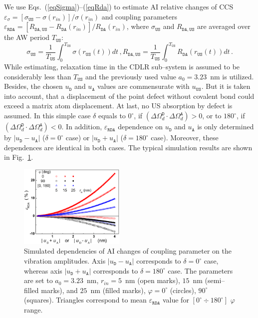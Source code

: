 \documentclass[aip,jap, amsmath,amssymb,reprint]{revtex4-1}
\begin{document}
We use Eqs.~(\ref{eqSigma})--(\ref{eqRda}) to estimate AI relative changes of CCS
$\varepsilon_\sigma=[\sigma_{\mathtt{US}}-\sigma(r_{in})]/\sigma(r_{in})$
and coupling parameters $\varepsilon_{\mathtt{RDA}}=[R_{\mathtt{DA,US}}-R_\mathtt{DA}(r_{in})]/R_\mathtt{DA}(r_{in})$,
where $\sigma_{\mathtt{US}}$ and $R_{\mathtt{DA,US}}$ are averaged over the AW period $T_\mathtt{US}$:
\begin{equation*}
\label{eqAver}
\sigma_{\mathtt{US}}=\frac{1}{T_\mathtt{US}}\int^{T_\mathtt{US}}_0\!\!\!\!\!\!\sigma(r_\mathtt{US}(t))dt\,,
R_{\mathtt{DA,US}}=\frac{1}{T_\mathtt{US}}\int^{T_\mathtt{US}}_0\!\!\!\!\!\!R_{\mathtt{DA}}(r_\mathtt{US}(t))dt\,.
\end{equation*}
While estimating, relaxation time in the CDLR sub--system is assumed to be considerably less than $T_\mathtt{US}$
and the previously used\cite{CDLR:JAP} value $a_0=3.23$~nm is utilized.
Besides, the chosen $u_\mathtt{D}$ and $u_\mathtt{A}$ values are commensurate with $u_\mathtt{US}$.
But it is taken into account, that a displacement of the point defect without covalent bond could exceed a matrix atom displacement.
At last, no US  absorption by defect is assumed.
In this simple case $\delta$ equals to $0^\circ$, if $(\Delta\Omega_d^\mathtt{D}\cdot\Delta\Omega_d^\mathtt{A})>0$,
or to $180^\circ$, if $(\Delta\Omega_d^\mathtt{D}\cdot\Delta\Omega_d^\mathtt{A})<0$.
In addition, $\varepsilon_{\mathtt{RDA}}$ dependence on
$u_\mathtt{D}$ and $u_\mathtt{A}$
is only determined by $|u_\mathtt{D}-u_\mathtt{A}|$ ($\delta=0^\circ$ case) or $|u_\mathtt{D}+u_\mathtt{A}|$ ($\delta=180^\circ$ case).
Moreover, these dependences are identical in both cases.
The typical simulation results are shown in  Fig.~\ref{fig_Erda}.


\begin{figure}
\includegraphics[width=0.45\textwidth]{fig_6}%
\caption{\label{fig_Erda}
Simulated dependencies of AI changes of coupling parameter on the vibration amplitudes.
Axis $|u_\mathtt{D}-u_\mathtt{A}|$ corresponds to $\delta=0^\circ$ case, whereas axis $|u_\mathtt{D}+u_\mathtt{A}|$ corresponds to $\delta=180^\circ$ case.
The parameters are set to $a_0=3.23$~nm,
$r_{in}=5$~nm (open marks), $15$~nm (semi--filled marks), and $25$~nm (filled marks),
$\varphi=0^\circ$ (circles), $90^\circ$ (squares).
Triangles correspond to mean $\varepsilon_{\mathtt{RDA}}$ value for $[0^\circ\div 180^\circ]$ $\varphi$ range.
}%
\end{figure}
\end{document}
